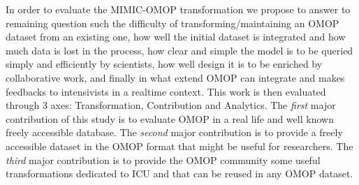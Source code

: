 In order to evaluate the MIMIC-OMOP transformation we propose to answer to
remaining question such the difficulty of transforming/maintaining an OMOP
dataset from an existing one, how well the initial dataset is integrated and
how much data is lost in the process, how clear and simple the model is to be
queried simply and efficiently by scientists, how well design it is to be
enriched by collaborative work, and finally in what extend OMOP can integrate
and makes feedbacks to intensivists in a realtime context.  This work is then
evaluated through 3 axes: Transformation, Contribution and Analytics.
The \emph{first} major contribution of this study is to evaluate OMOP in a real
life and well known freely accessible database. The \emph{second} major
contribution is to provide a freely accessible dataset in the OMOP format that
might be useful for researchers. The \emph{third} major contribution is to
provide the OMOP community some useful transformations dedicated to ICU and
that can be reused in any OMOP dataset.
